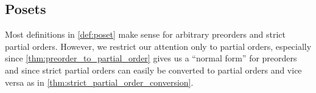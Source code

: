 \subsection{Posets}\label{subsec:posets}

\begin{note}\label{note:only_partial_orders}
  Most definitions in \cref{def:poset} make sense for arbitrary preorders and strict partial orders. However, we restrict our attention only to partial orders, especially since \cref{thm:preorder_to_partial_order} gives us a \enquote{normal form} for preorders and since strict partial orders can easily be converted to partial orders and vice versa as in \cref{thm:strict_partial_order_conversion}.
\end{note}

